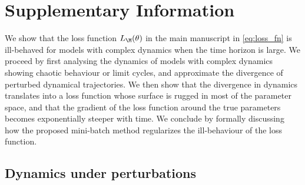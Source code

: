 
\graphicspath{{./content/chap3_mini-batching/}}


\section{Supplementary Information}
\label{secSI:mini-batching}

We show that the loss function $L_\M(\theta)$ in the main manuscript in \cref{eq:loss_fn} is ill-behaved for models with complex dynamics when the time horizon is large. We proceed by first analysing the dynamics of models with complex dynamics showing chaotic behaviour or limit cycles, and approximate the divergence of perturbed dynamical trajectories. We then show that the divergence in dynamics translates into a loss function whose surface is rugged in most of the parameter space, and that the gradient of the loss function around the true parameters becomes exponentially steeper with time. We conclude by formally discussing how the proposed mini-batch method regularizes the ill-behaviour of the loss function.

\subsection{Dynamics under perturbations}

